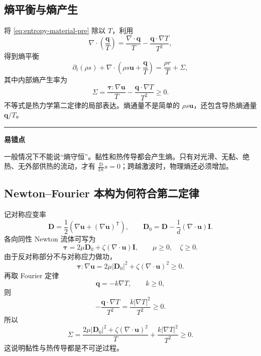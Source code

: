 \documentclass[cn,hazy,blue,11pt,normal]{elegantnote}
\numberwithin{equation}{section}
\newcommand{\Dt}{\frac{\mathrm D}{\mathrm Dt}}
\newcommand{\vct}[1]{\bm{#1}}
\newcommand{\ten}[1]{\bm{#1}}
\newenvironment{warningbox}{%
  \par\medskip\noindent\color{red!65!black}\rule{0.8em}{0.8em}\quad
  \begin{minipage}{0.91\linewidth}\color{black}\textbf{易错点}\quad
}{\end{minipage}\par\medskip}
\begin{document}
\subsection{熵平衡与熵产生}

将 \eqref{eq:entropy-material-pre} 除以 $T$，利用
\begin{equation}
 \nabla\cdot\left(\frac{\vct q}{T}\right)
 =\frac{\nabla\cdot\vct q}{T}
 -\frac{\vct q\cdot\nabla T}{T^2},
\end{equation}
得到熵平衡
\begin{equation}
 \boxed{
 \partial_t(\rho s)+\nabla\cdot\left(\rho s\vct u+\frac{\vct q}{T}\right)
 =\frac{\rho r}{T}+\Sigma,
 } \label{eq:entropy-balance}
\end{equation}
其中内部熵产生率为
\begin{equation}
 \boxed{\Sigma=
 \frac{\ten\tau:\nabla\vct u}{T}
 -\frac{\vct q\cdot\nabla T}{T^2}\ge 0.} \label{eq:entropy-production}
\end{equation}
不等式是热力学第二定律的局部表达。熵通量不是简单的 $\rho s\vct u$，还包含导热熵通量 $\vct q/T$。

\begin{warningbox}
一般情况下不能说“熵守恒”。黏性和热传导都会产生熵。只有对光滑、无黏、绝热、无外部供热的流动，才有 $\Dt s=0$；跨越激波时，物理熵还必须增加。
\end{warningbox}

\subsection{Newton--Fourier 本构为何符合第二定律}

记对称应变率
\begin{equation}
 \ten D=\frac12\left(\nabla\vct u+(\nabla\vct u)^{\mathsf T}\right),
 \qquad
 \ten D_0=\ten D-\frac1d(\nabla\cdot\vct u)\ten I.
\end{equation}
各向同性 Newton 流体可写为
\begin{equation}
 \boxed{\ten\tau=2\mu\ten D_0+\zeta(\nabla\cdot\vct u)\ten I,}
 \qquad \mu\ge0,\quad\zeta\ge0.
\end{equation}
由于反对称部分不与对称应力做功，
\begin{equation}
 \ten\tau:\nabla\vct u
 =2\mu|\ten D_0|^2+\zeta(\nabla\cdot\vct u)^2\ge0.
\end{equation}
再取 Fourier 定律
\begin{equation}
 \vct q=-k\nabla T,\qquad k\ge0,
\end{equation}
则
\begin{equation}
 -\frac{\vct q\cdot\nabla T}{T^2}
 =\frac{k|\nabla T|^2}{T^2}\ge0.
\end{equation}
所以
\begin{equation}
 \boxed{\Sigma=
 \frac{2\mu|\ten D_0|^2+\zeta(\nabla\cdot\vct u)^2}{T}
 +\frac{k|\nabla T|^2}{T^2}\ge0.}
\end{equation}
这说明黏性与热传导都是不可逆过程。
\end{document}
